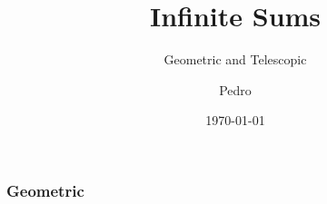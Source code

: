 \documentclass[14pt]{beamer}
\author{Pedro}
\title{Infinite Sums}
\subtitle{Geometric and Telescopic}
\institute{}
\date{\today}
\begin{document}
\maketitle

\begin{frame}
	\frametitle{Geometric}
\end{frame}
\end{document}
